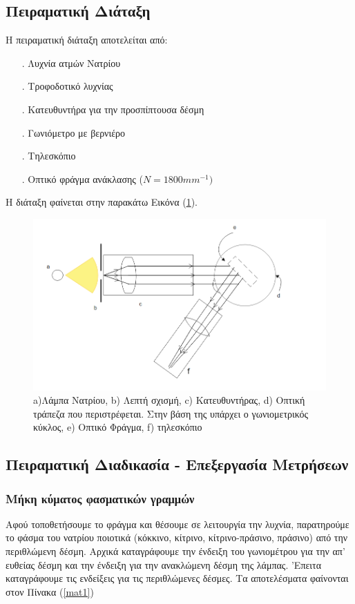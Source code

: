 \documentclass[a4paper]{article}
\begin{document}
	\subsection*{Πειραματική Διάταξη}
	Η πειραματική διάταξη αποτελείται από: 
	\begin{itemize}
		\item[.] Λυχνία ατμών Νατρίου 
		\item[.] Τροφοδοτικό λυχνίας 
		\item[.] Κατευθυντήρα για την προσπίπτουσα δέσμη 
		\item[.] Γωνιόμετρο με βερνιέρο
		\item[.] Τηλεσκόπιο
		\item[.] Οπτικό φράγμα ανάκλασης ($Ν=1800mm^{-1})$
	\end{itemize}
	
	Η διάταξη φαίνεται στην παρακάτω Εικόνα (\ref{Im1}).
	\begin{figure}[h!]
		\centering
		\includegraphics[width=0.8\linewidth]{setup.png}
		\caption{  a)Λάμπα Νατρίου, b) Λεπτή σχισμή, c) Κατευθυντήρας, d) Οπτική τράπεζα που περιστρέφεται. Στην βάση της υπάρχει ο γωνιομετρικός κύκλος, e) Οπτικό Φράγμα, f) τηλεσκόπιο}
		\label{Im1}
	\end{figure}
	
\subsection*{Πειραματική Διαδικασία - Επεξεργασία Μετρήσεων}	
	
	\subsubsection*{Μήκη κύματος φασματικών γραμμών}
	Αφού τοποθετήσουμε το φράγμα και θέσουμε σε λειτουργία την λυχνία, παρατηρούμε το φάσμα του νατρίου ποιοτικά (κόκκινο, κίτρινο, κίτρινο-πράσινο, πράσινο) από την περιθλώμενη δέσμη. Αρχικά καταγράφουμε την ένδειξη του γωνιομέτρου για την απ' ευθείας δέσμη και την ένδειξη για την ανακλώμενη δέσμη της λάμπας. 'Επειτα καταγράφουμε τις ενδείξεις για τις περιθλώμενες δέσμες. Τα αποτελέσματα φαίνονται στον Πίνακα (\ref{mat1})
	
\end{document}
